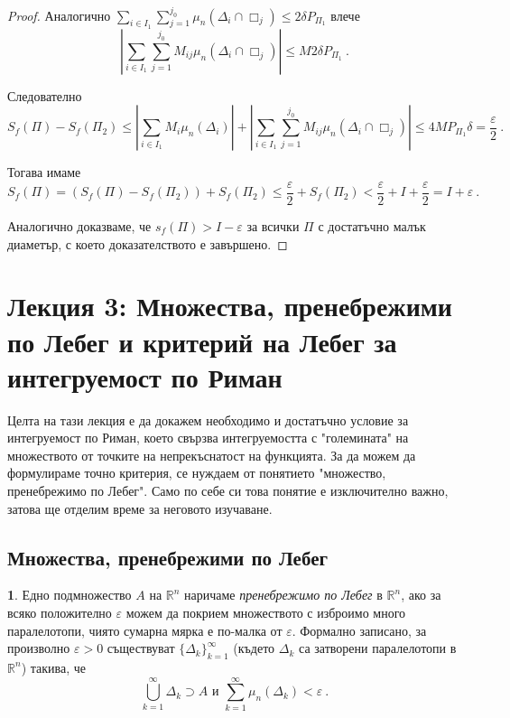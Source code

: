 \documentclass[11pt]{article}
\numberwithin{equation}{section}
\numberwithin{figure}{section}
\numberwithin{table}{section}
\theoremstyle{plain}
\theoremstyle{definition}
\newtheorem{defn}[thm]{\protect\definitionname}
\theoremstyle{remark}
\theoremstyle{definition}
\theoremstyle{remark}
\theoremstyle{plain}
\theoremstyle{definition}
\theoremstyle{definition}
\theoremstyle{plain}
\theoremstyle{plain}
\theoremstyle{plain}
\theoremstyle{definition}
\theoremstyle{plain}
\providecommand{\definitionname}{Дефиниция}
\newcommand*{\R}{\mathbb{R}}
\begin{document}
\begin{proof}
Аналогично
$\sum_{i\in I_1} \sum_{j=1}^{j_0} \mu_n (\Delta_i\cap \Box_j)\leq 2 \delta P_{\Pi_1}$ влече $$\left|\sum_{i\in I_1} \sum_{j=1}^{j_0} M_{ij} \mu_n (\Delta_i\cap \Box_j)\right| \leq M 2 \delta  P_{\Pi_1} \ .$$

Следователно
$$
S_f(\Pi) - S_f(\Pi_2) \leq \left|\sum_{i\in I_1} M_i \mu_n (\Delta_i)\right| + \left|\sum_{i\in I_1} \sum_{j=1}^{j_0} M_{ij} \mu_n (\Delta_i\cap \Box_j)\right| \leq 4M P_{\Pi_1} \delta =  \frac{\varepsilon}{2} \ .
$$

Тогава имаме
$$
S_f(\Pi) = (S_f(\Pi) - S_f(\Pi_2)) + S_f(\Pi_2) \leq \frac{\varepsilon}{2} + S_f(\Pi_2) < \frac{\varepsilon}{2} + I + \frac{\varepsilon}{2} = I+\varepsilon \ .
$$

Аналогично доказваме, че $s_f(\Pi) > I-\varepsilon$ за всички $\Pi$ с достатъчно малък диаметър, с което доказателството е завършено.
\end{proof}

\newpage

\section{Лекция 3: Множества, пренебрежими по Лебег и критерий на Лебег за интегруемост по Риман}

Целта на тази лекция е да докажем необходимо и достатъчно условие за интегруемост по Риман, което свързва интегруемостта с "големината" на множеството от точките на непрекъснатост на функцията. За да можем да формулираме точно критерия, се нуждаем от понятието "множество, пренебрежимо по Лебег". Само по себе си това понятие е изключително важно, затова ще отделим време за неговото изучаване. 

\subsection{Множества, пренебрежими по Лебег}

\begin{defn} Едно подмножество $A$ на $\R^n$ наричаме \textit{пренебрежимо по Лебег} в $\R^n$, ако за всяко положително $\varepsilon$ можем да покрием множеството с изброимо много паралелотопи, чиято сумарна мярка е по-малка от $\varepsilon$. Формално записано, за произволно
$\varepsilon > 0$ съществуват $\{\Delta_k \}_{k=1}^\infty$ (където $\Delta_k$ са затворени паралелотопи в $\R^n$) такива, че $$\bigcup_{k=1}^\infty \Delta_k \supset A  \mbox{ и } \sum_{k=1}^\infty \mu_n(\Delta_k)<\varepsilon \ .$$
\end{defn}
\end{document}
